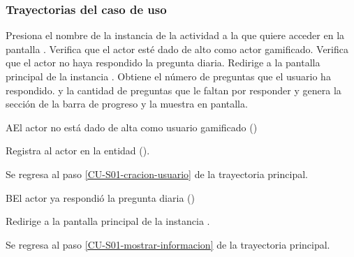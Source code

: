 \subsubsection{Trayectorias del caso de uso}

\begin{UCtrayectoria}%
%
 	\Actor Presiona el nombre de la instancia de la actividad a la que quiere acceder en la pantalla .
    \Sistema Verifica que el actor esté dado de alto como actor gamificado. 
    \label{CU-S01-cracion-usuario}
	\Sistema Verifica que el actor no haya respondido la pregunta diaria. 
    \Sistema Redirige a la pantalla principal de la instancia .
	\Sistema Obtiene el número de preguntas que el usuario ha respondido.
    \label{CU-S01-mostrar-informacion}
	y la cantidad de preguntas que le faltan por responder y genera la sección de la barra de progreso y la muestra en pantalla.

\end{UCtrayectoria}

\begin{UCtrayectoriaA}{A}{El actor no está dado de alta como usuario gamificado ()}

  \Sistema Registra al actor en la entidad ().
    \item Se regresa al paso \ref{CU-S01-cracion-usuario} de la trayectoria principal.


\end{UCtrayectoriaA}


\begin{UCtrayectoriaA}{B}{El actor ya respondió la pregunta diaria ()}

    \Sistema Redirige a la pantalla principal de la instancia .
    \item Se regresa al paso \ref{CU-S01-mostrar-informacion} de la trayectoria principal.


\end{UCtrayectoriaA}




